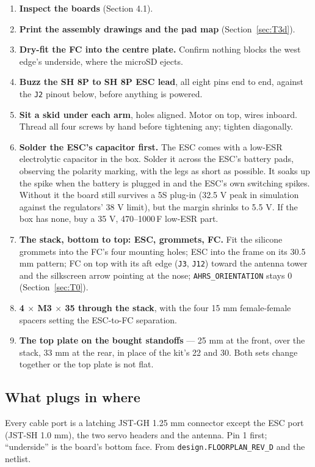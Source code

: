 \documentclass[11pt,a4paper]{article}
\newcommand{\file}[1]{\texttt{\small #1}}
\begin{document}
\begin{enumerate}
\item \textbf{Inspect the boards} (Section 4.1).
\item \textbf{Print the assembly drawings and the pad map} (Section~\ref{sec:T3d}).
\item \textbf{Dry-fit the FC into the centre plate.} Confirm nothing blocks the west
edge's underside, where the microSD ejects.
\item \textbf{Buzz the SH 8P to SH 8P ESC lead}, all eight pins end to end, against the
\file{J2} pinout below, before anything is powered.
\item \textbf{Sit a skid under each arm}, holes aligned. Motor on top, wires inboard.
Thread all four screws by hand before tightening any; tighten diagonally.
\item \textbf{Solder the ESC's capacitor first.} The ESC comes with a low-ESR electrolytic
capacitor in the box. Solder it across the ESC's battery pads, observing the polarity
marking, with the legs as short as possible. It soaks up the spike when the battery is
plugged in and the ESC's own switching spikes. Without it the board still survives a 5S
plug-in (32.5 V peak in simulation against the regulators' 38 V limit), but the margin
shrinks to 5.5 V. If the box has none, buy a 35 V, 470--1000\,\textmu F low-ESR part.
\item \textbf{The stack, bottom to top: ESC, grommets, FC.} Fit the silicone grommets into
the FC's four mounting holes; ESC into the frame on its 30.5 mm pattern; FC on top with
its aft edge (\file{J3}, \file{J12}) toward the antenna tower and the silkscreen arrow
pointing at the nose; \file{AHRS\_ORIENTATION} stays 0 (Section~\ref{sec:T0}).
\item \textbf{4 $\times$ M3 $\times$ 35 through the stack}, with the four 15 mm
female-female spacers setting the ESC-to-FC separation.
\item \textbf{The top plate on the bought standoffs} --- 25 mm at the front, over the
stack, 33 mm at the rear, in place of the kit's 22 and 30. Both sets change together or the
top plate is not flat.
\end{enumerate}

\subsection{What plugs in where}
\label{sec:plugs}

Every cable port is a latching JST-GH 1.25 mm connector except the ESC port (JST-SH 1.0 mm),
the two servo headers and the antenna. Pin 1 first; ``underside'' is the board's bottom face. From
\file{design.FLOORPLAN\_REV\_D} and the netlist.
\end{document}
